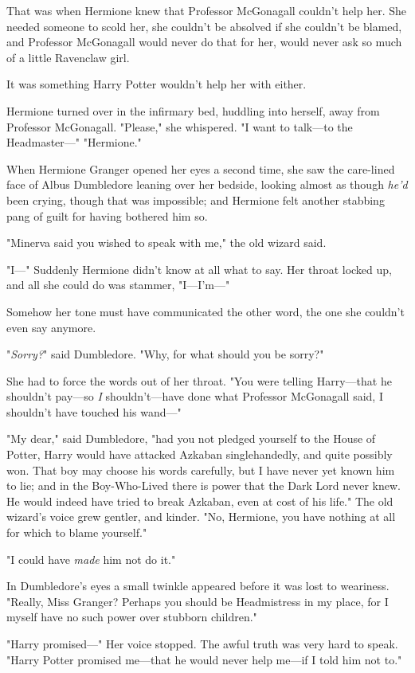 That was when Hermione knew that Professor McGonagall couldn't help her. She
needed someone to scold her, she couldn't be absolved if she couldn't be
blamed, and Professor McGonagall would never do that for her, would never ask
so much of a little Ravenclaw girl.

It was something Harry Potter wouldn't help her with either.

Hermione turned over in the infirmary bed, huddling into herself, away from
Professor McGonagall. "Please," she whispered. "I want to talk---to the
Headmaster---"
\sbreak
"Hermione."

When Hermione Granger opened her eyes a second time, she saw the care-lined
face of Albus Dumbledore leaning over her bedside, looking almost as though
\emph{he'd} been crying, though that was impossible; and Hermione felt another
stabbing pang of guilt for having bothered him so.

"Minerva said you wished to speak with me," the old wizard said.

"I---" Suddenly Hermione didn't know at all what to say. Her throat locked up,
and all she could do was stammer, "I---I'm---"

Somehow her tone must have communicated the other word, the one she couldn't
even say anymore.

"\emph{Sorry?}" said Dumbledore. "Why, for what should you be sorry?"

She had to force the words out of her throat. "You were telling Harry---that he
shouldn't pay---so \emph{I} shouldn't---have done what Professor McGonagall
said, I shouldn't have touched his wand---"

"My dear," said Dumbledore, "had you not pledged yourself to the House of
Potter, Harry would have attacked Azkaban singlehandedly, and quite possibly
won. That boy may choose his words carefully, but I have never yet known him to
lie; and in the Boy-Who-Lived there is power that the Dark Lord never knew. He
would indeed have tried to break Azkaban, even at cost of his life." The old
wizard's voice grew gentler, and kinder. "No, Hermione, you have nothing at all
for which to blame yourself."

"I could have \emph{made} him not do it."

In Dumbledore's eyes a small twinkle appeared before it was lost to weariness.
"Really, Miss Granger? Perhaps you should be Headmistress in my place, for I
myself have no such power over stubborn children."

"Harry promised---" Her voice stopped. The awful truth was very hard to speak.
"Harry Potter promised me---that he would never help me---if I told him not to."

